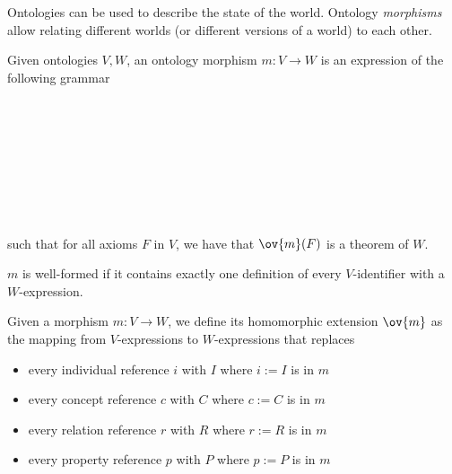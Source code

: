 Ontologies can be used to describe the state of the world.
Ontology \emph{morphisms} allow relating different worlds (or different versions of a world) to each other.

\begin{definition}
Given ontologies $V,W$, an ontology morphism $m:V\to W$ is an expression of the following grammar
\begin{commgrammar}
\\
\\
\\
\\
\\
\\
\\
\end{commgrammar}
such that for all axioms $F$ in $V$, we have that $\ov{m}(F)$ is a theorem of $W$.

$m$ is well-formed if it contains exactly one definition of every $V$-identifier with a $W$-expression.
\end{definition}

\begin{definition}
Given a morphism $m:V\to W$, we define its homomorphic extension $\ov{m}$ as the mapping from $V$-expressions to $W$-expressions that replaces
\begin{itemize}
\item every individual reference $i$ with $I$ where $i:=I$ is in $m$
\item every concept reference $c$ with $C$ where $c:=C$ is in $m$
\item every relation reference $r$ with $R$ where $r:=R$ is in $m$
\item every property reference $p$ with $P$ where $p:=P$ is in $m$
\end{itemize}
\end{definition}


